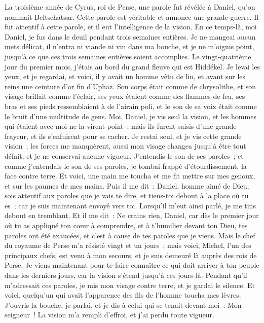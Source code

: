 \begin{multicols}{2}
\VerseOne{}La troisième année de Cyrus, roi de Perse, une parole fut révélée à Daniel, qu'on nommait Beltschatsar. Cette parole est véritable et annonce une grande guerre. Il fut attentif à cette parole, et il eut l'intelligence de la vision.
En ce temps-là, moi Daniel, je fus dans le deuil pendant trois semaines entières.
Je ne mangeai aucun mets délicat, il n'entra ni viande ni vin dans ma bouche, et je ne m'oignis point, jusqu'à ce que ces trois semaines entières soient accomplies.
Le vingt-quatrième jour du premier mois, j'étais au bord du grand fleuve qui est Hiddékel.
Je levai les yeux, et je regardai, et voici, il y avait un homme vêtu de lin, et ayant sur les reins une ceinture d'or fin d'Uphaz.
Son corps était comme de chrysolithe, et son visage brillait comme l'éclair, ses yeux étaient comme des flammes de feu, ses bras et ses pieds ressemblaient à de l'airain poli, et le son de sa voix était comme le bruit d'une multitude de gens.
Moi, Daniel, je vis seul la vision, et les hommes qui étaient avec moi ne la virent point~; mais ils furent saisis d'une grande frayeur, et ils s'enfuirent pour se cacher.
Je restai seul, et je vis cette grande vision~; les forces me manquèrent, aussi mon visage changea jusqu'à être tout défait, et je ne conservai aucune vigueur.
J'entendis le son de ses paroles~; et comme j'entendais le son de ses paroles, je tombai frappé d'étourdissement, la face contre terre.
Et voici, une main me toucha et me fit mettre sur mes genoux, et sur les paumes de mes mains.
Puis il me dit~: Daniel, homme aimé de Dieu, sois attentif aux paroles que je vais te dire, et tiens-toi debout à la place où tu es~; car je suis maintenant envoyé vers toi. Lorsqu'il m'eut ainsi parlé, je me tins debout en tremblant.
Et il me dit~: Ne crains rien, Daniel, car dès le premier jour où tu as appliqué ton cœur à comprendre, et à t'humilier devant ton Dieu, tes paroles ont été exaucées, et c'est à cause de tes paroles que je viens.
Mais le chef du royaume de Perse m'a résisté vingt et un jours~; mais voici, Michel, l'un des principaux chefs, est venu à mon secours, et je suis demeuré là auprès des rois de Perse.
Je viens maintenant pour te faire connaître ce qui doit arriver à ton peuple dans les derniers jours, car la vision s'étend jusqu'à ces jours-là.
Pendant qu'il m'adressait ces paroles, je mis mon visage contre terre, et je gardai le silence.
Et voici, quelqu'un qui avait l'apparence des fils de l'homme toucha mes lèvres. J'ouvris la bouche, je parlai, et je dis à celui qui se tenait devant moi~: Mon seigneur~! La vision m'a rempli d'effroi, et j'ai perdu toute vigueur.

\end{multicols}
